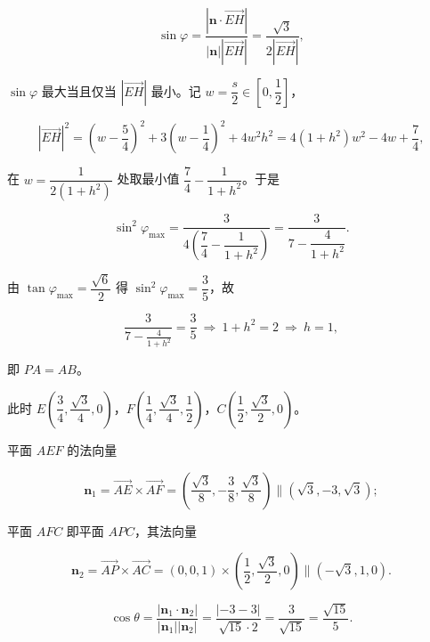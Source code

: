 \begin{answer}
\nopagebreak[4]
\[\sin\varphi=\frac{\left|\boldsymbol n\cdot\overrightarrow{EH}\right|}{\left|\boldsymbol n\right|\left|\overrightarrow{EH}\right|}=\frac{\sqrt3}{2\left|\overrightarrow{EH}\right|},\]

$\sin\varphi$ 最大当且仅当 $\left|\overrightarrow{EH}\right|$ 最小。记 $w=\dfrac s2\in\left[0,\dfrac12\right]$，

\nopagebreak[4]
\[\left|\overrightarrow{EH}\right|^2=\left(w-\frac54\right)^2+3\left(w-\frac14\right)^2+4w^2h^2=4(1+h^2)w^2-4w+\frac74,\]

在 $w=\dfrac1{2(1+h^2)}$ 处取最小值 $\dfrac74-\dfrac1{1+h^2}$。于是

\nopagebreak[4]
\[\sin^2\varphi_{\max}=\frac{3}{4\left(\dfrac74-\dfrac1{1+h^2}\right)}=\frac3{7-\dfrac4{1+h^2}}.\]

由 $\tan\varphi_{\max}=\dfrac{\sqrt6}2$ 得 $\sin^2\varphi_{\max}=\dfrac35$，故

\nopagebreak[4]
\[\frac3{7-\frac4{1+h^2}}=\frac35\ \Longrightarrow\ 1+h^2=2\ \Longrightarrow\ h=1,\]

即 $PA=AB$。

此时 $E\left(\dfrac34,\dfrac{\sqrt3}4,0\right)$，$F\left(\dfrac14,\dfrac{\sqrt3}4,\dfrac12\right)$，$C\left(\dfrac12,\dfrac{\sqrt3}2,0\right)$。

平面 $AEF$ 的法向量

\nopagebreak[4]
\[\boldsymbol n_1=\overrightarrow{AE}\times\overrightarrow{AF}=\left(\frac{\sqrt3}8,-\frac38,\frac{\sqrt3}8\right)\parallel\left(\sqrt3,-3,\sqrt3\right);\]

平面 $AFC$ 即平面 $APC$，其法向量

\nopagebreak[4]
\[\boldsymbol n_2=\overrightarrow{AP}\times\overrightarrow{AC}=(0,0,1)\times\left(\frac12,\frac{\sqrt3}2,0\right)\parallel\left(-\sqrt3,1,0\right).\]

\nopagebreak[4]
\[\cos\theta=\frac{\left|\boldsymbol n_1\cdot\boldsymbol n_2\right|}{\left|\boldsymbol n_1\right|\left|\boldsymbol n_2\right|}=\frac{\left|-3-3\right|}{\sqrt{15}\cdot2}=\frac{3}{\sqrt{15}}=\frac{\sqrt{15}}5.\]


\end{answer}
